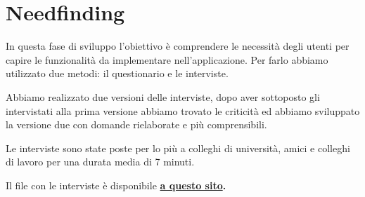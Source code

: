 \documentclass{article}
\begin{document}
\section{Needfinding} 
In questa fase di sviluppo l’obiettivo è comprendere le necessità degli utenti per capire le funzionalità da implementare nell’applicazione. Per farlo abbiamo utilizzato due metodi: il questionario e le interviste.
    \vspace{1cm}
     \par
    \vspace{0.5cm}
\par Abbiamo realizzato due versioni delle interviste, dopo aver sottoposto gli intervistati alla prima versione abbiamo trovato le criticità ed abbiamo sviluppato la versione due con domande rielaborate e più comprensibili. \par Le interviste sono state poste per lo più a colleghi di università, amici e colleghi di lavoro per una durata media di 7 minuti.\par
\par Il file con le interviste è disponibile \textbf{\href{https://wind-blob-6b0.notion.site/Interviste-de02a85b8b634f7687534d2064010b4a}{a questo sito}.}\par
  \vspace{1cm}\par
    \vspace{0.5cm}
\end{document}
